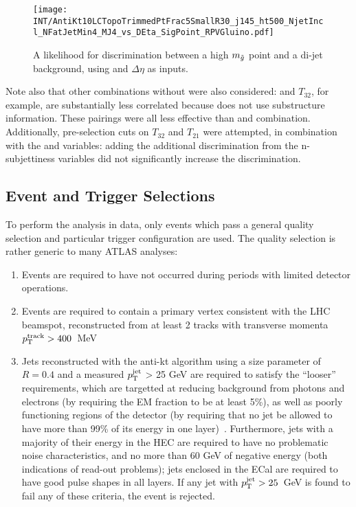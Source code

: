 

\begin{figure}
\centering
\texttt{[image: INT/AntiKt10LCTopoTrimmedPtFrac5SmallR30\_j145\_ht500\_NjetIncl\_NFatJetMin4\_MJ4\_vs\_DEta\_SigPoint\_RPVGluino.pdf]}
\label{fig:search:search:optimization:2D:DETAraw}
\caption{A likelihood for discrimination between a high $m_{\tilde{g}}$ point and a \herwigpp di-jet background, using \MJ and $\Delta \eta$ as inputs.}
\end{figure}



Note also that other combinations without \MJ were also considered: \Ht and $T_{32}$, for example, are substantially less correlated because \Ht does not use substructure information. These pairings were all less effective than \MJ and \Deta combination. Additionally, pre-selection cuts on $T_{32}$ and $T_{21}$ were attempted, in combination with the \MJ and \Deta variables: adding the additional discrimination from the n-subjettiness variables did not significantly increase the discrimination.


\subsection{Event and Trigger Selections}

To perform the analysis in data, only events which pass a general quality selection and particular trigger configuration are used. The quality selection is rather generic to many ATLAS analyses:
%
\begin{enumerate}
\item Events are required to have not occurred during periods with limited detector operations.
\item Events are required to contain a primary vertex consistent with the LHC beamspot, reconstructed from at least 2 tracks with transverse momenta $p_{\text{T}}^{\mathrm{track}} > 400$~MeV
\item Jets reconstructed with the anti-kt algorithm using a size parameter of $R = 0.4$ and a measured $p_{\text{T}}^{\mathrm{jet}}$ > 25 GeV are required to satisfy the “looser” requirements, which are targetted at reducing background from photons and electrons (by requiring the EM fraction to be at least 5\%), as well as poorly functioning regions of the detector (by requiring that no jet be allowed to have more than 99\% of its energy in one layer)~\cite{jetquality}. Furthermore, jets with a majority of their energy in the HEC are required to have no problematic noise characteristics, and no more than 60 GeV of negative energy (both indications of read-out problems); jets enclosed in the ECal are required to have good pulse shapes in all layers. If any jet with $p_{\text{T}}^{\mathrm{jet}} > 25$~GeV is found to fail any of these criteria, the event is rejected.
\end{enumerate} 
%

